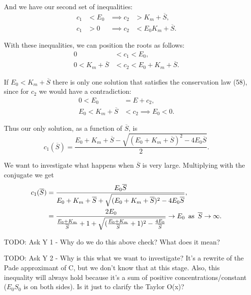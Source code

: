 \documentclass[12pt]{article}
\begin{document}
And we have our second set of inequalities:
\begin{align}
  c_1 &< E_0 &\implies c_2 &> K_m + \overline{S}, \\
  c_1 &> 0 &\implies c_2 &< E_0 K_m + \overline{S}.
\end{align}

With these inequalities, we can position the roots as follows:
\begin{align}
  0 &< c_1 < E_0, \\
  0 < K_m + \overline{S} &< c_2 < E_0 + K_m + \overline{S}.
\end{align}

%
%

If $E_0 < K_m + \overline{S}$ there is only one solution that
satisfies the conservation law (58), since for $c_2$ we would have a
contradiction:
\begin{align}
  0 < E_0 &= E + c_2, \\
  E_0 < K_m + \overline{S} &< c_2 \implies E_0 < 0.
\end{align}

Thus our only solution, as a function of $\overline{S}$, is
\begin{equation}
  c_1(\overline{S}) = \frac{E_0 + K_m + \overline{S} - \sqrt{(E_0 +
      K_m + \overline{S})^2 - 4 E_0 \overline{S}}}{2}.
\end{equation}

We want to investigate what happens when $\overline{S}$ is very
large. Multiplying with the conjugate we get
\begin{align}
  c_1(\overline{S}) &= \frac{E_0 \overline{S}}{E_0 + K_m + \overline{S} +
    \sqrt{(E_0 +K_m + \overline{S})^2 - 4 E_0 \overline{S}}}, \\
                    &= \frac{2 E_0}{\frac{E_0 + K_m}{\overline{S}} + 1 +
    \sqrt{(\frac{E_0 + K_m}{\overline{S}} + 1)^2 - \frac{4 E_0}{\overline{S}}}}
  \to  E_0 \enskip \text{as} \enskip \overline{S} \to \infty.
\end{align}

TODO: Ask Y 1 - Why do we do this above check? What does it mean?

TODO: Ask Y 2 - Why is this what we want to investigate? It's a
rewrite of the Pade approximant of C, but we don't know that at this
stage. Also, this inequality will always hold because it's a sum of
positive concentrations/constant ($E_0 S_0$ is on both sides). Is it just
to clarify the Taylor O(x)?
\end{document}
